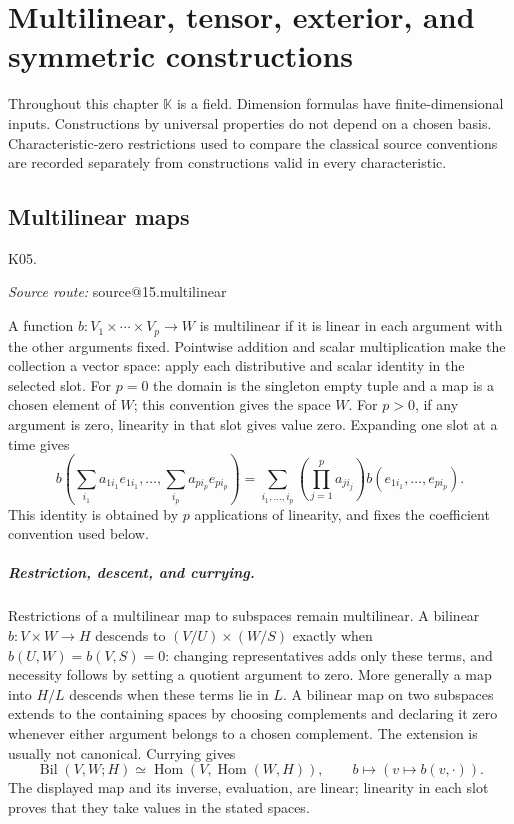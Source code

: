 \documentclass[11pt,a4paper]{book}
\makeatletter
\theoremstyle{definition}\newtheorem{definition}[theorem]{Definition}
\theoremstyle{remark}\newtheorem{remark}[theorem]{Remark}
\newcommand{\K}{\mathbb K}\newcommand{\R}{\mathbb R}\newcommand{\C}{\mathbb C}
\DeclareMathOperator{\Hom}{Hom}\DeclareMathOperator{\End}{End}
\newcommand{\Kentry}[2]{\section{#2}\label{k:#1}\noindent\textsf{\small K05.\detokenize{#1}}\par
  \begingroup\small\color{black!65}\textit{Source route: }\csname source@#1\endcsname\par\endgroup}
\makeatother
\begin{document}


\chapter{Multilinear, tensor, exterior, and symmetric constructions}
Throughout this chapter $\K$ is a field. Dimension formulas have finite-dimensional inputs. Constructions by universal properties do not depend on a chosen basis. Characteristic-zero restrictions used to compare the classical source conventions are recorded separately from constructions valid in every characteristic.

\Kentry{15.multilinear}{Multilinear maps}
A function $b:V_1\times\cdots\times V_p\to W$ is multilinear if it is linear in each argument with the other arguments fixed. Pointwise addition and scalar multiplication make the collection a vector space: apply each distributive and scalar identity in the selected slot. For $p=0$ the domain is the singleton empty tuple and a map is a chosen element of $W$; this convention gives the space $W$. For $p>0$, if any argument is zero, linearity in that slot gives value zero. Expanding one slot at a time gives
\[
 b\left(\sum_{i_1}a_{1i_1}e_{1i_1},\ldots,\sum_{i_p}a_{pi_p}e_{pi_p}\right)
 =\sum_{i_1,\ldots,i_p}\left(\prod_{j=1}^p a_{ji_j}\right)b(e_{1i_1},\ldots,e_{pi_p}).
\]
This identity is obtained by $p$ applications of linearity, and fixes the coefficient convention used below.


\paragraph{Restriction, descent, and currying.}
Restrictions of a multilinear map to subspaces remain multilinear. A bilinear $b:V\times W\to H$ descends to $(V/U)\times(W/S)$ exactly when $b(U,W)=b(V,S)=0$: changing representatives adds only these terms, and necessity follows by setting a quotient argument to zero. More generally a map into $H/L$ descends when these terms lie in $L$. A bilinear map on two subspaces extends to the containing spaces by choosing complements and declaring it zero whenever either argument belongs to a chosen complement. The extension is usually not canonical. Currying gives
\[
 \operatorname{Bil}(V,W;H)\simeq\Hom(V,\Hom(W,H)),\qquad b\longmapsto(v\mapsto b(v,\cdot)).
\]
The displayed map and its inverse, evaluation, are linear; linearity in each slot proves that they take values in the stated spaces.
\end{document}
